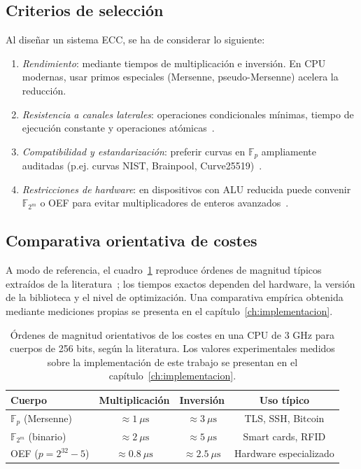 \subsection*{Criterios de selección}
Al diseñar un sistema ECC, se ha de considerar lo siguiente:
\begin{enumerate}
  \item \emph{Rendimiento}: mediante tiempos de multiplicación e inversión. En CPU modernas, usar primos especiales (Mersenne, pseudo-Mersenne) acelera la reducción\citep{bernstein2006curve25519}.
  \item \emph{Resistencia a canales laterales}: operaciones condicionales mínimas, tiempo de ejecución constante y operaciones atómicas~\citep{kocher1999dpa}.
  \item \emph{Compatibilidad y estandarización}: preferir curvas en \(\mathbb{F}_p\) ampliamente auditadas (p.ej. curvas NIST, Brainpool, Curve25519)~\citep{ietf-cfrg}.
  \item \emph{Restricciones de hardware}: en dispositivos con ALU reducida puede convenir \(\mathbb{F}_{2^m}\) o OEF para evitar multiplicadores de enteros avanzados~\citep{militzer2004oef}.
\end{enumerate}

\subsection*{Comparativa orientativa de costes}

A modo de referencia, el cuadro~\ref{tab:comparativa_campos} reproduce órdenes de magnitud típicos extraídos de la literatura~\citep{openssl-bench,hankerson2004guide}; los tiempos exactos dependen del hardware, la versión de la biblioteca y el nivel de optimización. Una comparativa empírica obtenida mediante mediciones propias se presenta en el capítulo~\ref{ch:implementacion}.

\begin{table}[H]
  \centering
  \begin{tabular}{lccc}
    \hline
    \textbf{Cuerpo} & \textbf{Multiplicación} & \textbf{Inversión} & \textbf{Uso típico} \\
    \hline
    \(\mathbb{F}_p\) (Mersenne) & \(\approx1\ \mu\mathrm{s}\) & \(\approx3\ \mu\mathrm{s}\) & TLS, SSH, Bitcoin \\
    \(\mathbb{F}_{2^m}\) (binario) & \(\approx2\ \mu\mathrm{s}\) & \(\approx5\ \mu\mathrm{s}\) & Smart cards, RFID \\
    OEF (\(p=2^{32}-5\))          & \(\approx0.8\ \mu\mathrm{s}\)& \(\approx2.5\ \mu\mathrm{s}\)& Hardware especializado\\
    \hline
  \end{tabular}
  \caption{Órdenes de magnitud orientativos de los costes en una CPU de 3 GHz para cuerpos de 256 bits, según la literatura. Los valores experimentales medidos sobre la implementación de este trabajo se presentan en el capítulo~\ref{ch:implementacion}.}
  \label{tab:comparativa_campos}
\end{table}
